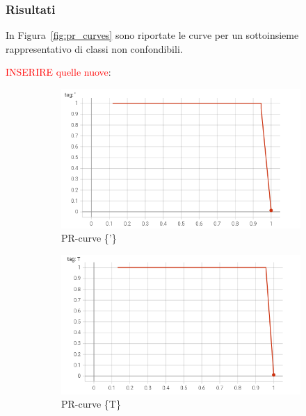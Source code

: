 \subsubsection*{Risultati}
In Figura~\ref{fig:pr_curves} sono riportate le curve per un sottoinsieme rappresentativo di classi non confondibili.

\textcolor{red}{INSERIRE quelle nuove}:
\begin{figure}[htbp]
    \centering
    \begin{subfigure}[t]{0.32\textwidth}
        \centering
        \includegraphics[width=\textwidth]{images/pr_curve1.png}
        \caption{PR-curve \{'\}}
    \end{subfigure}
    \begin{subfigure}[t]{0.32\textwidth}
        \centering
        \includegraphics[width=\textwidth]{images/pr_curve2.png}
        \caption{PR-curve \{T\}}
    \end{subfigure}
    \begin{subfigure}[t]{0.32\textwidth}
        \centering

\end{subfigure}
\end{figure}
